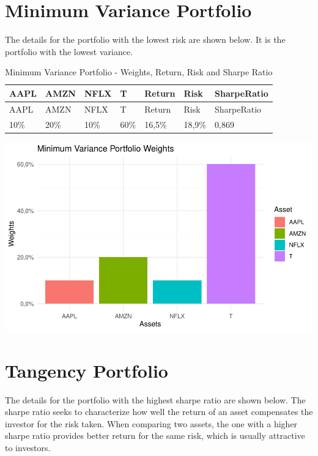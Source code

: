 \documentclass[
]{article}
\begin{document}
\newpage

\hypertarget{minimum-variance-portfolio}{%
\section{Minimum Variance Portfolio}\label{minimum-variance-portfolio}}

The details for the portfolio with the lowest risk are shown below. It
is the portfolio with the lowest variance.

\begin{longtable}[]{@{}lllllll@{}}
\caption{Minimum Variance Portfolio - Weights, Return, Risk and Sharpe
Ratio}\tabularnewline
\toprule()
AAPL & AMZN & NFLX & T & Return & Risk & SharpeRatio \\
\midrule()
\endfirsthead
\toprule()
AAPL & AMZN & NFLX & T & Return & Risk & SharpeRatio \\
\midrule()
\endhead
10\% & 20\% & 10\% & 60\% & 16,5\% & 18,9\% & 0,869 \\
\bottomrule()
\end{longtable}

\begin{center}\includegraphics{EfficientFrontier_files/figure-latex/plot Minimum Variance Portfolio-1} \end{center}

\newpage

\hypertarget{tangency-portfolio}{%
\section{Tangency Portfolio}\label{tangency-portfolio}}

The details for the portfolio with the highest sharpe ratio are shown
below. The sharpe ratio seeks to characterize how well the return of an
asset compensates the investor for the risk taken. When comparing two
assets, the one with a higher sharpe ratio provides better return for
the same risk, which is usually attractive to investors.
\end{document}
